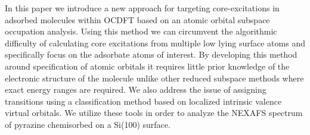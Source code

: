 \documentclass{article}
\begin{document}
In this paper we introduce a new approach for targeting core-excitations in adsorbed molecules within OCDFT based on an atomic orbital subspace occupation analysis. Using this method we can circumvent the algorithmic difficulty of calculating core excitations from multiple low lying surface atoms and specifically focus on the adsorbate atoms of interest. By developing this method around specification of atomic orbitals it requires little prior knowledge of the electronic structure of the molecule unlike other reduced subspace methods where exact energy ranges are required. We also address the issue of assigning transitions using a classification method based on localized intrinsic valence virtual orbitals.\cite{derricotte_localized_2017} We utilize these tools in order to analyze the NEXAFS spectrum of pyrazine chemisorbed on a Si(100) surface. 

\end{document}
